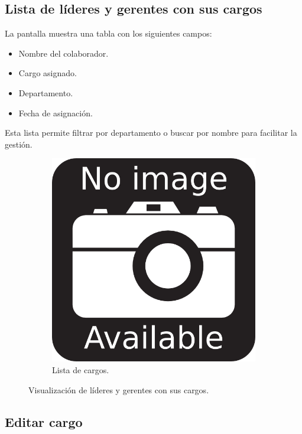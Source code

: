 \subsection{Lista de líderes y gerentes con sus cargos}

La pantalla muestra una tabla con los siguientes campos:

\begin{itemize}
    \item Nombre del colaborador.
    \item Cargo asignado.
    \item Departamento.
    \item Fecha de asignación.
\end{itemize}

Esta lista permite filtrar por departamento o buscar por nombre para facilitar la gestión.

\begin{figure}[h]
\centering
\begin{subfigure}{0.4\textwidth}
    \includegraphics[width=\textwidth]{imgs/no-image.png}
    \caption{Lista de cargos.}
    \label{fig:cargos2}
\end{subfigure}
\caption{Visualización de líderes y gerentes con sus cargos.}
\end{figure}

\subsection{Editar cargo}

